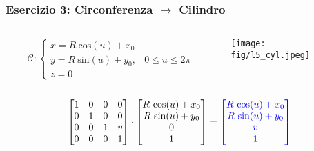 \documentclass{beamer}
\newcommand{\fig}{./figures} %
\newcommand{\msin}{\mbox{sin}} %
\newcommand{\mcos}{\mbox{cos}} %
\begin{document}
\begin{frame}
\frametitle{Esercizio 3: Circonferenza $\rightarrow$ Cilindro}
\begin{columns}
\begin{column}{0.58\textwidth}
\begin{displaymath}
\mathcal{C}:
\begin{cases}
x = R~\mcos(u) + x_0\\
y = R~\msin(u) + y_0, & 0\le u\le 2\pi\\
z = 0
\end{cases}
\end{displaymath}
\end{column}
\begin{column}{0.39\textwidth}
\texttt{[image: \\fig/l5\_cyl.jpeg]}

\end{column}
\end{columns}
%
\vspace{0.1\textheight}
\begin{displaymath}
\begin{bmatrix}
1 & 0 & 0 & 0\\
0 & 1 & 0 & 0\\
0 & 0 & 1 & v\\
0 & 0 & 0 & 1
\end{bmatrix}
\cdot
\begin{bmatrix}
R~\mcos(u)+x_0\\
R~\msin(u)+y_0\\
0\\
1
\end{bmatrix}
= 
{\color{blue}
\begin{bmatrix}
R ~\mcos(u)+x_0\\
R ~\msin(u)+y_0\\
v\\
1
\end{bmatrix}
}
\end{displaymath}
\end{frame}
\end{document}
